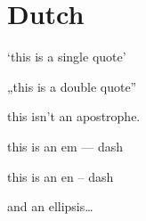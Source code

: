 
\def\mytitle{MultiMarkdown Dutch Test}


\part{Dutch}
\label{dutch}

`this is a single quote'

„this is a double quote''

this isn't an apostrophe.

this is an em --- dash

this is an en -- dash

and an ellipsis{\ldots}




